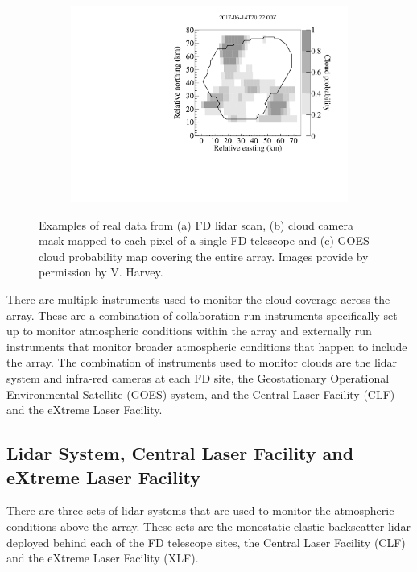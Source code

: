 \begin{figure}[!t]
\begin{subfigure}[b]{0.3\textwidth}
\caption{} \label{subfig:IR_cloudcam}
\end{subfigure}
\begin{subfigure}[b]{0.3\textwidth}
\includegraphics[width=\textwidth]{chapters/graphs/CloudFlags/ir_cloudprobability_map.pdf}
\caption{} \label{subfig:GOES}
\end{subfigure}
\caption{Examples of real data from (a) FD lidar scan, (b) cloud camera mask mapped to each pixel of a single FD telescope and (c) GOES cloud probability map covering the entire array.  Images provide by permission by V. Harvey.}
\end{figure}

There are multiple instruments used to monitor the cloud coverage across the array. These are a combination of collaboration run instruments specifically set-up to monitor atmospheric conditions within the array and externally run instruments that monitor broader atmospheric conditions that happen to include the array. The combination of instruments used to monitor clouds are the lidar system and infra-red cameras at each FD site, the Geostationary Operational Environmental Satellite (GOES) system, and the Central Laser Facility (CLF) and the eXtreme Laser Facility.

 
\subsection{Lidar System, Central Laser Facility and eXtreme Laser Facility}

There are three sets of lidar systems that are used to monitor the atmospheric conditions above the array. These sets are the monostatic elastic backscatter lidar deployed behind each of the FD telescope sites, the Central Laser Facility (CLF) and the eXtreme Laser Facility (XLF).

